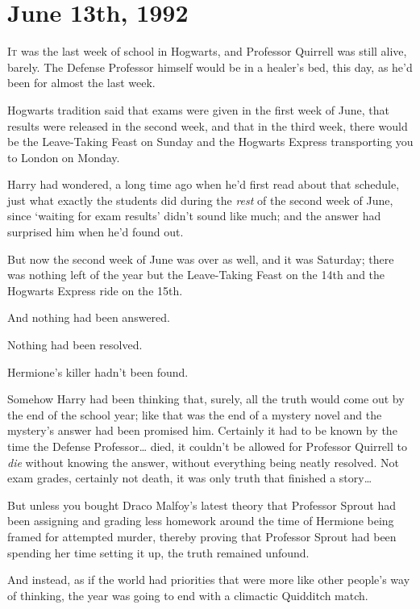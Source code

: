 
\section{June 13th, 1992}

\lettrine{I}{t} was the last week of school in Hogwarts, and Professor Quirrell was still alive, barely. The Defense Professor himself would be in a healer's bed, this day, as he'd been for almost the last week.

Hogwarts tradition said that exams were given in the first week of June, that results were released in the second week, and that in the third week, there would be the Leave-Taking Feast on Sunday and the Hogwarts Express transporting you to London on Monday.

Harry had wondered, a long time ago when he'd first read about that schedule, just what exactly the students did during the \emph{rest} of the second week of June, since `waiting for exam results' didn't sound like much; and the answer had surprised him when he'd found out.

But now the second week of June was over as well, and it was Saturday; there was nothing left of the year but the Leave-Taking Feast on the 14th and the Hogwarts Express ride on the 15th.

And nothing had been answered.

Nothing had been resolved.

Hermione's killer hadn't been found.

Somehow Harry had been thinking that, surely, all the truth would come out by the end of the school year; like that was the end of a mystery novel and the mystery's answer had been promised him. Certainly it had to be known by the time the Defense Professor{\ldots} died, it couldn't be allowed for Professor Quirrell to \emph{die} without knowing the answer, without everything being neatly resolved. Not exam grades, certainly not death, it was only truth that finished a story{\ldots}

But unless you bought Draco Malfoy's latest theory that Professor Sprout had been assigning and grading less homework around the time of Hermione being framed for attempted murder, thereby proving that Professor Sprout had been spending her time setting it up, the truth remained unfound.

And instead, as if the world had priorities that were more like other people's way of thinking, the year was going to end with a climactic Quidditch match.

